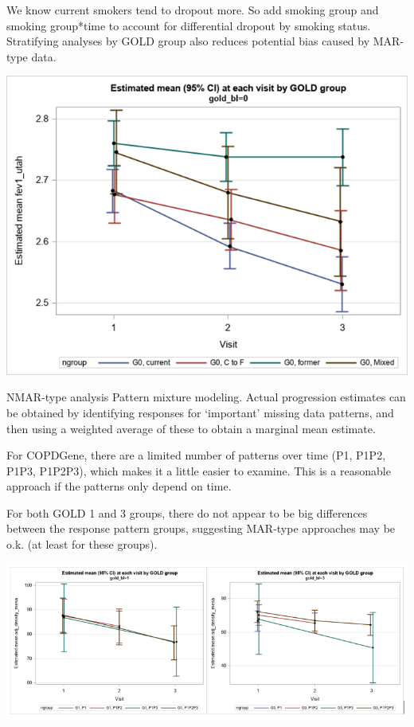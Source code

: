\documentclass[
  9pt,
  ignorenonframetext,
]{beamer}
\begin{document}
\begin{frame}{}
\protect\hypertarget{section-17}{}
We know current smokers tend to dropout more. So add smoking group and
smoking group*time to account for differential dropout by smoking
status. Stratifying analyses by GOLD group also reduces potential bias
caused by MAR-type data.

\begin{center}\includegraphics[width=0.7\linewidth]{figs_L20/f13} \end{center}
\end{frame}

\begin{frame}{NMAR-type analysis}
\protect\hypertarget{nmar-type-analysis}{}
Pattern mixture modeling. Actual progression estimates can be obtained
by identifying responses for `important' missing data patterns, and then
using a weighted average of these to obtain a marginal mean estimate.

For COPDGene, there are a limited number of patterns over time (P1,
P1P2, P1P3, P1P2P3), which makes it a little easier to examine. This is
a reasonable approach if the patterns only depend on time.

For both GOLD 1 and 3 groups, there do not appear to be big differences
between the response pattern groups, suggesting MAR-type approaches may
be o.k. (at least for these groups).

\begin{center}\includegraphics[width=0.7\linewidth]{figs_L20/f14} \end{center}
\end{frame}
\end{document}
